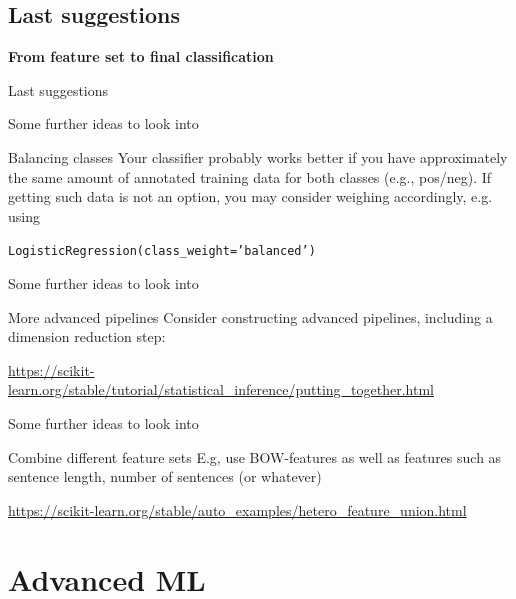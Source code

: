 \documentclass{beamer}
\begin{document}
\subsection{Last suggestions}

\begin{frame}[plain]
\textbf{From feature set to final classification}

Last suggestions
\end{frame}


\begin{frame}{Some further ideas to look into}

\begin{block}{Balancing classes}
Your classifier probably works better if you have approximately the same amount of annotated training data for both classes (e.g., pos/neg). If getting such data is not an option, you may consider weighing accordingly, e.g. using

\texttt{LogisticRegression(class\_weight='balanced')}
\end{block}

\end{frame}

\begin{frame}{Some further ideas to look into}

\begin{block}{More advanced pipelines}
Consider constructing advanced pipelines, including a dimension reduction step: 


\url{https://scikit-learn.org/stable/tutorial/statistical\_inference/putting\_together.html}
\end{block}

\end{frame}



\begin{frame}{Some further ideas to look into}

\begin{block}{Combine different feature sets}
E.g, use BOW-features as well as features such as sentence length, number of sentences (or whatever)


\url{
https://scikit-learn.org/stable/auto\_examples/hetero\_feature\_union.html}
\end{block}

\end{frame}


\section{Advanced ML}
\end{document}
